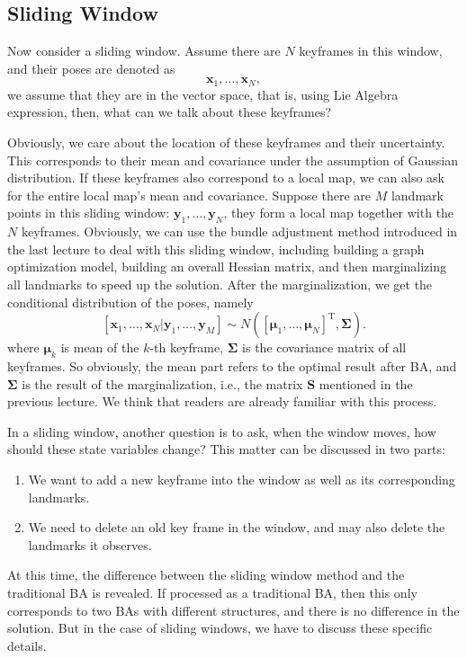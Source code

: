 \subsection{Sliding Window}
Now consider a sliding window. Assume there are $N$ keyframes in this window, and their poses are denoted as $$\bm{x}_1, \ldots, \bm{x}_N,$$ we assume that they are in the vector space, that is, using Lie Algebra expression, then, what can we talk about these keyframes?

Obviously, we care about the location of these keyframes and their uncertainty. This corresponds to their mean and covariance under the assumption of Gaussian distribution. If these keyframes also correspond to a local map, we can also ask for the entire local map's mean and covariance. Suppose there are $M$ landmark points in this sliding window: $\bm{y}_1, \ldots, \bm{y}_N$, they form a local map together with the $N$ keyframes. Obviously, we can use the bundle adjustment method introduced in the last lecture to deal with this sliding window, including building a graph optimization model, building an overall Hessian matrix, and then marginalizing all landmarks to speed up the solution. After the marginalization, we get the conditional distribution of the poses, namely $$[\bm{x}_1, \ldots, \bm{x}_N | \bm{y}_1, \ldots, \bm{y}_M ] \sim N([\boldsymbol{\mu }_1, \ldots, \boldsymbol{\mu}_N]^\mathrm{T}, \boldsymbol{\Sigma}).$$ where $\boldsymbol{\mu}_k$ is mean of the $k$-th keyframe, $\boldsymbol{\Sigma}$ is the covariance matrix of all keyframes. So obviously, the mean part refers to the optimal result after BA, and $\boldsymbol{\Sigma}$ is the result of the marginalization, i.e., the matrix $\bm{S}$ mentioned in the previous lecture. We think that readers are already familiar with this process.

In a sliding window, another question is to ask, when the window moves, how should these state variables change? This matter can be discussed in two parts:

\begin{enumerate}
	\item We want to add a new keyframe into the window as well as its corresponding landmarks.
	\item We need to delete an old key frame in the window, and may also delete the landmarks it observes.
\end{enumerate}

At this time, the difference between the sliding window method and the traditional BA is revealed. If processed as a traditional BA, then this only corresponds to two BAs with different structures, and there is no difference in the solution. But in the case of sliding windows, we have to discuss these specific details.


